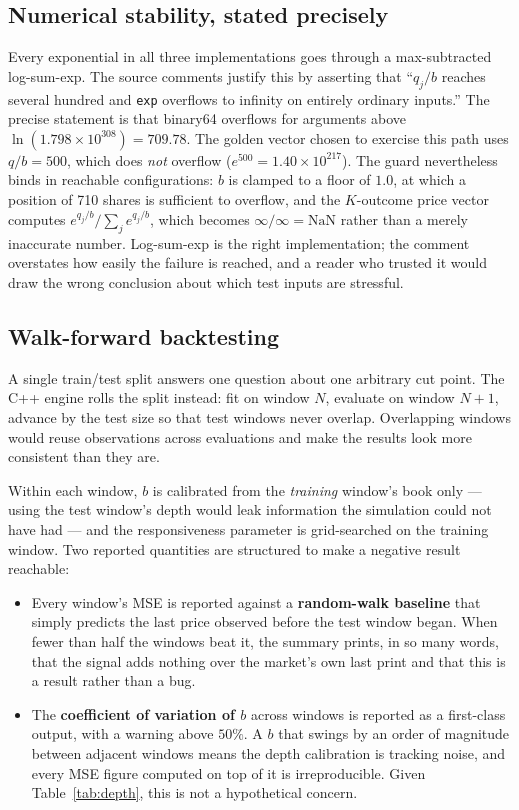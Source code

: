 \documentclass[11pt]{article}
\newcommand{\code}[1]{\texttt{\small #1}}
\begin{document}
\subsection{Numerical stability, stated precisely}

Every exponential in all three implementations goes through a max-subtracted
log-sum-exp. The source comments justify this by asserting that ``$q_j/b$
reaches several hundred and \code{exp} overflows to infinity on entirely
ordinary inputs.'' The precise statement is that binary64 overflows for
arguments above $\ln(1.798 \times 10^{308}) = 709.78$. The golden vector chosen
to exercise this path uses $q/b = 500$, which does \emph{not} overflow
($e^{500} = 1.40 \times 10^{217}$). The guard nevertheless binds in reachable
configurations: $b$ is clamped to a floor of $1.0$, at which a position of 710
shares is sufficient to overflow, and the $K$-outcome price vector computes
$e^{q_j/b}/\sum_j e^{q_j/b}$, which becomes $\infty/\infty = \text{NaN}$ rather
than a merely inaccurate number. Log-sum-exp is the right implementation; the
comment overstates how easily the failure is reached, and a reader who trusted
it would draw the wrong conclusion about which test inputs are stressful.

\subsection{Walk-forward backtesting}

A single train/test split answers one question about one arbitrary cut point.
The C++ engine rolls the split instead: fit on window $N$, evaluate on window
$N+1$, advance by the test size so that test windows never overlap. Overlapping
windows would reuse observations across evaluations and make the results look
more consistent than they are.

Within each window, $b$ is calibrated from the \emph{training} window's book
only --- using the test window's depth would leak information the simulation
could not have had --- and the responsiveness parameter is grid-searched on the
training window. Two reported quantities are structured to make a negative
result reachable:

\begin{itemize}\itemsep2pt
\item Every window's MSE is reported against a \textbf{random-walk baseline}
      that simply predicts the last price observed before the test window began.
      When fewer than half the windows beat it, the summary prints, in so many
      words, that the signal adds nothing over the market's own last print and
      that this is a result rather than a bug.
\item The \textbf{coefficient of variation of $b$} across windows is reported as
      a first-class output, with a warning above $50\%$. A $b$ that swings by an
      order of magnitude between adjacent windows means the depth calibration is
      tracking noise, and every MSE figure computed on top of it is
      irreproducible. Given Table~\ref{tab:depth}, this is not a hypothetical
      concern.
\end{itemize}
\end{document}
